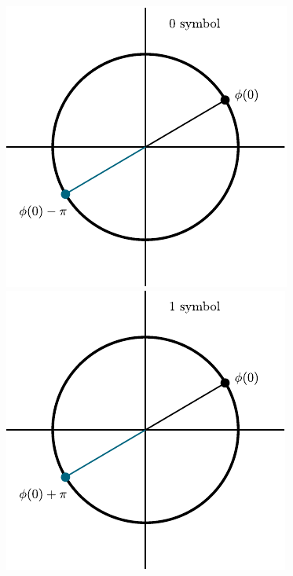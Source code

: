 \begin{frame}
\begin{center}
         {
            \includegraphics[scale=0.7]{img/symboldecision_animation/0symbol2} \quad
            \includegraphics[scale=0.7]{img/symboldecision_animation/1symbol2}
        }


\end{center}
\end{frame}

